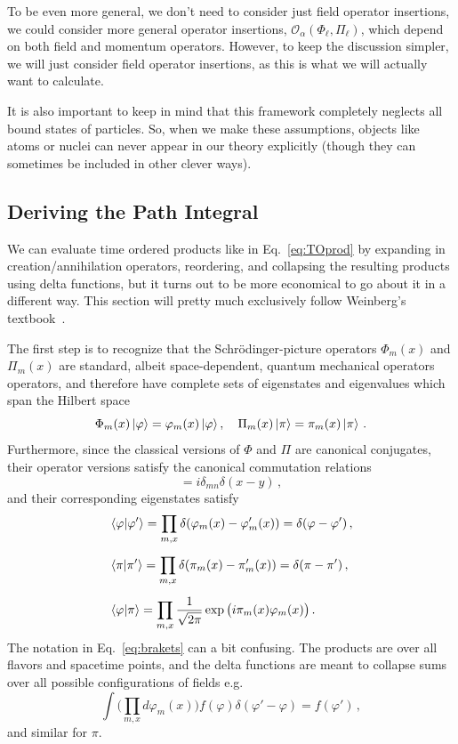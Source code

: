 \documentclass{article}
\numberwithin{equation}{subsection}
\begin{document}
To be even more general, we don't need to consider just field operator insertions, we could consider more general operator insertions, $\mathcal{O}_\alpha(\Phi_\ell,\Pi_\ell)$, 
which depend on both field and momentum operators. However, to keep the discussion simpler, we will just consider field operator insertions, as this is what we will actually want to calculate.

It is also important to keep in mind that this framework completely neglects all bound states of particles. So, when we
make these assumptions, objects like atoms or nuclei can never appear in our theory explicitly (though they can
sometimes be included in other clever ways).

\subsection{Deriving the Path Integral}

We can evaluate time ordered products like in Eq.~\eqref{eq:TOprod} by expanding in creation/annihilation operators, reordering, and collapsing the resulting products using 
delta functions, but it turns out to be more economical to go about it in a different way. This section will pretty much
exclusively follow Weinberg's textbook~\cite{Weinberg_1995}.

The first step is to recognize that the Schr\"odinger-picture operators $\Phi_m(x)$ and $\Pi_m(x)$ are standard, albeit space-dependent, quantum mechanical operators operators,
and therefore have complete sets of eigenstates and eigenvalues which span the Hilbert space
\begin{equation}
    \Phi_m(x)\ket{\varphi} = \varphi_m(x)\ket{\varphi}, \quad \Pi_m(x)\ket{\pi} = \pi_m(x)\ket{\pi}\,.
\end{equation}
Furthermore, since the classical versions of $\Phi$ and $\Pi$ are canonical conjugates, their operator versions satisfy the canonical commutation relations
\begin{equation}
    [\Phi_m(x),\Pi_n(x)] = i\delta_{mn}\delta(x - y)\,,
\end{equation}
and their corresponding eigenstates satisfy
\begin{equation}\begin{split}\label{eq:brakets}
    &\braket{\varphi}{\varphi'} = \prod_{m, x}\delta(\varphi_m(x) - \varphi'_m(x)) = \delta(\varphi - \varphi')\,,\\[0.5em]
    &\braket{\pi}{\pi'} = \prod_{m, x}\delta(\pi_m(x) - \pi'_m(x)) = \delta(\pi - \pi')\,,\\[0.5em]
    &\braket{\varphi}{\pi} = \prod_{m, x}\frac{1}{\sqrt{2\pi}}\exp\big(i\pi_m(x)\varphi_m(x)\big)\,.
\end{split}\end{equation}
The notation in Eq.~\eqref{eq:brakets} can a bit confusing. The products are over all flavors and spacetime points, and the delta functions are meant to collapse sums over all 
possible configurations of fields e.g.
\begin{equation}
    \int \Big(\prod_{m, x}d\varphi_m(x)\Big) f(\varphi)\delta(\varphi' - \varphi) = f(\varphi')\,,
\end{equation}
and similar for $\pi$.
\end{document}

